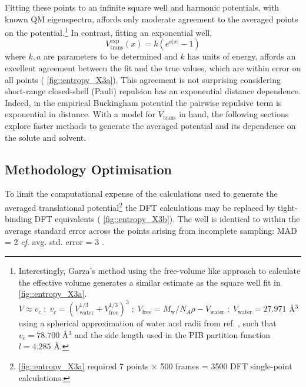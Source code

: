 \documentclass[../main.tex]{subfiles}
\begin{document}
Fitting these points to an infinite square well and harmonic potentials, with known QM eigenspectra, affords only moderate agreement to the averaged points on the potential.\footnote{Interestingly, Garza's method using the free-volume like approach to calculate the effective volume generates a similar estimate as the square well fit in \figurename{ \ref{fig::entropy_X3a}}. $V \approx v_c \; ; \; v_c = (V_\text{water}^{1/3} + V_\text{free}^{1/3})^3 \; ; \; V_\text{free} = M_\text{w} / N_A \rho - V_\text{water} \; ;\; V_\text{water} = 27.971$ \AA${}^3$ using a spherical approximation of water and radii from ref. \cite{CRC}
, such that $v_c = 78.700$ \AA${}^3$ and the side length used in the PIB partition function $l = 4.285$ \AA.} In contrast, fitting an exponential well,
\begin{equation}
V_\text{trans}^\text{exp}(x) = k (e^{a|x|} - 1)
\end{equation}
where $k, a$ are parameters to be determined and $k$ has units of energy, affords an excellent agreement between the fit and the true values, which are within error on all points (\figurename{ \ref{fig::entropy_X3a}}). This agreement is not surprising considering short-range closed-shell (Pauli) repulsion has an exponential distance dependence.\cite{Bolliger2013} Indeed, in the empirical Buckingham potential %
the pairwise repulsive term is exponential in distance.\cite{Buckingham1938} With a model for $V_\text{trans}$ in hand, the following sections explore faster methods to generate the averaged potential and its dependence on the solute and solvent.

\newpage
\subsection{Methodology Optimisation}
To limit the computational expense of the calculations used to generate the averaged translational potential\footnote{\figurename{ \ref{fig::entropy_X3a}} required 7 points $\times$ 500 frames = 3500 DFT single-point calculations.} the DFT calculations may be replaced by tight-binding DFT equivalents (\figurename{ \ref{fig::entropy_X3b}}). The well is identical to within the average standard error across the points arising from incomplete sampling: MAD = 2 \kcal \emph{ cf}. avg. std. error = 3 \kcal.
\end{document}
